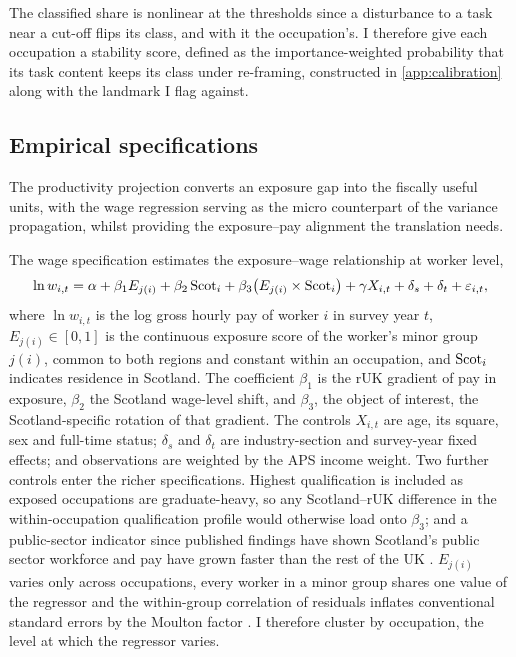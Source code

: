 The classified share is nonlinear at the thresholds since a disturbance to a task near a cut-off flips its class, and with it the occupation's. I therefore give each occupation a stability score, defined as the importance-weighted probability that its task content keeps its class under re-framing, constructed in \cref{app:calibration} along with the landmark I flag against.

\subsection{Empirical specifications}\label{sec:specs}
The productivity projection converts an exposure gap into the fiscally useful units, with the wage regression serving as the micro counterpart of the variance propagation, whilst providing the exposure--pay alignment the translation needs. 
 
The wage specification estimates the exposure--wage relationship at worker level,
\begin{equation}\label{eq:wage}
\ln w_{i,t} = \alpha + \beta_1 E_{j(i)} + \beta_2\, \mathrm{Scot}_i +
\beta_3 \bigl( E_{j(i)} \times \mathrm{Scot}_i \bigr) + \gamma X_{i,t} +
\delta_s + \delta_t + \varepsilon_{i,t},
\end{equation}
where $\ln w_{i,t}$ is the log gross hourly pay of worker $i$ in survey year $t$, $E_{j(i)} \in [0,1]$ is the continuous exposure score of the worker's minor group $j(i)$, common to both regions and constant within an occupation, and $\mathrm{Scot}_i$ indicates residence in Scotland. The coefficient $\beta_1$ is the rUK gradient of pay in exposure, $\beta_2$ the Scotland wage-level shift, and $\beta_3$, the object of interest, the Scotland-specific rotation of that gradient. The controls $X_{i,t}$ are age, its square, sex and full-time status; $\delta_s$ and $\delta_t$ are industry-section and survey-year fixed effects; and observations are weighted by the APS income weight. Two further controls enter the richer specifications. Highest qualification is included as exposed occupations are graduate-heavy, so any Scotland--rUK difference in the within-occupation qualification profile would otherwise load onto $\beta_3$; and a public-sector indicator since published findings have shown Scotland's public sector workforce and pay have grown faster than the rest of the UK \citep{cribb2025}. $E_{j(i)}$ varies only across occupations, every worker in a minor group shares one value of the regressor and the within-group correlation of residuals inflates conventional standard errors by the Moulton factor \citep{moulton1990}. I therefore cluster by occupation, the level at which the regressor varies.

